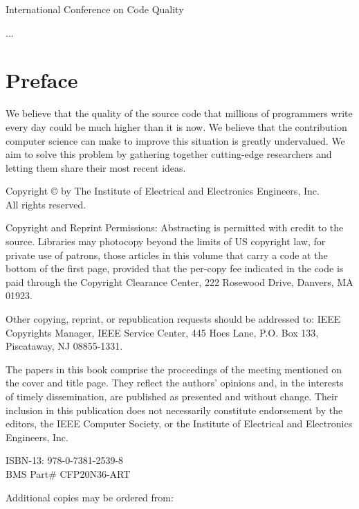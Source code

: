 \documentclass[12pt,a4,twosides]{book}
\begin{document}
International Conference on Code Quality

...

\newpage

\section{Preface}

We believe that the quality of the source code that millions of programmers
write every day could be much higher than it is now. We believe that the
contribution computer science can make to improve this situation is greatly
undervalued. We aim to solve this problem by gathering
together cutting-edge researchers and letting them share their most recent ideas.


\newpage

\begin{center}
Copyright \copyright{} \the\year{}
by The Institute of Electrical and Electronics Engineers, Inc.\\
All rights reserved.
\end{center}

Copyright and Reprint Permissions: Abstracting is permitted with credit to the source. Libraries may photocopy beyond the limits of US copyright law, for private use of patrons, those articles in this volume that carry a code at the bottom of the first page, provided that the per-copy fee indicated in the code is paid through the Copyright Clearance Center, 222 Rosewood Drive, Danvers, MA 01923.

Other copying, reprint, or republication requests should be addressed to: IEEE Copyrights Manager, IEEE Service Center, 445 Hoes Lane, P.O. Box 133, Piscataway, NJ 08855-1331.

The papers in this book comprise the proceedings of the meeting mentioned on the cover and title page. They reflect the authors’ opinions and, in the interests of timely dissemination, are published as presented and without change. Their inclusion in this publication does not necessarily constitute endorsement by the editors, the IEEE Computer Society, or the Institute of Electrical and Electronics Engineers, Inc.

\begin{center}
ISBN-13: 978-0-7381-2539-8\\
BMS Part\# CFP20N36-ART
\end{center}

\begin{center}
Additional copies may be ordered from:
\end{center}
\end{document}

